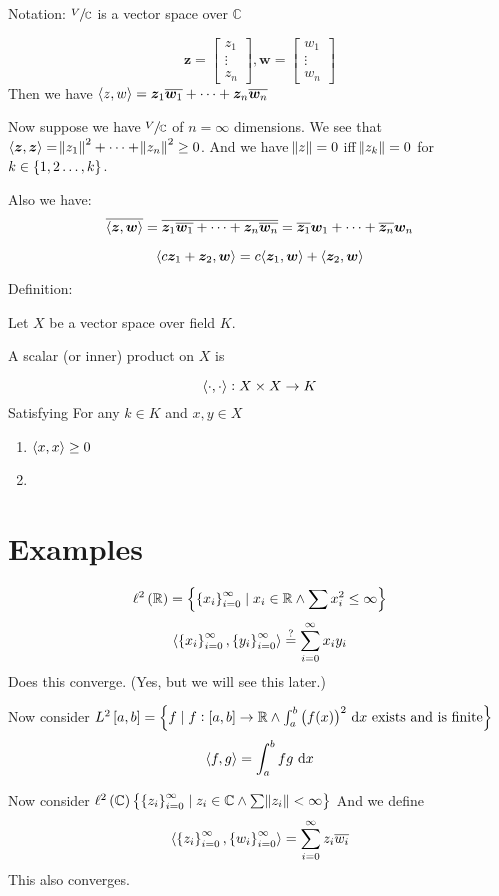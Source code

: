 \documentclass{article}
\DeclarePairedDelimiter\ip{\langle }{\rangle}
\newcommand{\sm}[1]{\left[\begin{smallmatrix} #1 \end{smallmatrix}\right]}
\newcommand{\RR}{\mathbb{R}}
\newcommand{\CC}{\mathbb{C}}
\begin{document}
Notation: \(\sfrac{V}{\CC}\) is a vector space over \(\CC\)

\[\bm z = \sm{z_1\\\vdots\\ z_n}, \bm w = \sm{w_1\\\vdots\\ w_n}\]
Then we have \(\ip{z, w} =\bm z_1 \overline{\bm w_1} + \dots + \bm z_n \overline{\bm w_n} \)

Now suppose we have \(\sfrac{V}{\CC}\) of \(n = \infty\) dimensions.
We see that \(\ip{\bm z, \bm z} = \norm{z_1}^2 + \cdots + \norm{z_n}^2 \geq 0\).
And we have \(\norm{z} = 0\) iff \(\norm{z_k} = 0\) for \(k \in \set{1,2\dots, k}\).

Also we have:
\[\overline{\ip{\bm z, \bm w}} = \overline{\bm z_1 \overline{\bm w_1} + \dots + \bm z_n \overline{\bm w_n}} =\overline{ \bm z_1} \bm w_1 + \dots + \overline{\bm z_n} \bm w_n\]

\[\ip{c\bm z_1 + \bm z_2, \bm w} = c\ip{\bm z_1, \bm w} + \ip{\bm z_2, \bm w}\]

Definition:

Let \(X\) be a vector space over field \(K\).

A scalar (or inner) product on \(X\) is

\[\ip{\cdot, \cdot} : X \times X \to K\]
Satisfying
For any \(k \in K\) and \(x, y \in X\)
\begin{enumerate}
\item \(\ip{x, x} \geq 0\)
\item
\end{enumerate}

\section{Examples}
\[\ell^2\del{\RR} = \set{\set{x_i}_{i=0}^\infty \mid x_i \in \RR \land \sum x_i^2 \leq \infty}\]
\[\ip{\set{x_i}_{i=0}^\infty, \set{y_i}_{i=0}^\infty} \stackrel{?}{=} \sum_{i = 0}^\infty x_i y_i\]
Does this converge.
(Yes, but we will see this later.)

Now consider \(L^2\intcc{a, b} = \set{f \mid f : \intcc{a, b} \to \RR \land \int_a^b\del{f(x)}^2 \,\dif x \text{ exists and is finite}}\)
\[\ip{f, g} = \int_a^b fg\,\dif x\]

Now consider \(\ell^2\del{\CC} \set{\set{z_i}_{i = 0}^\infty \mid z_i \in \CC \land \sum \norm{z_i} < \infty}\)
And we define
\[\ip{\set{z_i}_{i=0}^\infty, \set{w_i}_{i=0}^\infty} = \sum_{i = 0}^\infty z_i \overline{w_i}\]
This also converges.
\end{document}
